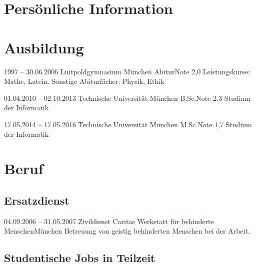 \documentclass[%
xcolor=svgnames,%
style=classic,%
]{komacv}
\begin{document}
\raggedbottom

\maketitle



\section{Pers\"onliche Information}




\section{Ausbildung}

\cventry
{1997 \newline -- 30.06.2006}
{Luitpoldgymnasium M\"unchen}{}
{Abitur}{Note 2,0}
{Leistungskurse: Mathe, Latein. Sonstige Abiturf\"acher: Physik, Ethik}

\cventry
{01.04.2010 \newline -- 02.10.2013}
{Technische Universit\"at M\"unchen}{}
{B.Sc.}{Note 2,3}
{Studium der Informatik}

\cventry
{17.05.2014 \newline -- 17.05.2016}
{Technische Universit\"at M\"unchen}{}
{M.Sc.}{Note 1,7}
{Studium der Informatik}



\section{Beruf}


\subsection{Ersatzdienst}

\cventry
{04.09.2006 \newline -- 31.05.2007}
{Zivildienst}
{Caritas Werkstatt f\"ur behinderte Menschen}{M\"unchen}{}
{Betreuung von geistig behinderten Menschen bei der Arbeit.}


\subsection{Studentische Jobs in Teilzeit}
\end{document}
